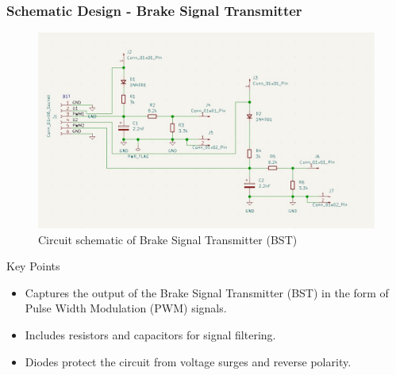 \documentclass[8pt,compress,aspectratio=169]{beamer}
\begin{document}
\begin{frame}
  \frametitle{Schematic Design - Brake Signal Transmitter}
  \begin{minipage}{0.6\textwidth}
    \begin{figure}
      \includegraphics[width=\textwidth]{assets/electronic/bst_schem.jpg}
      \caption{Circuit schematic of Brake Signal Transmitter (BST)}
    \end{figure}
  \end{minipage}
  \hfill
  \begin{minipage}{0.375\textwidth}
    \begin{block}{Key Points}
      \begin{itemize}
        \item Captures the output of the Brake Signal Transmitter (BST) in the form of Pulse Width Modulation (PWM) signals.
        \item Includes resistors and capacitors for signal filtering.
        \item Diodes protect the circuit from voltage surges and reverse polarity.
      \end{itemize}
    \end{block}
  \end{minipage}
\end{frame}
\end{document}
